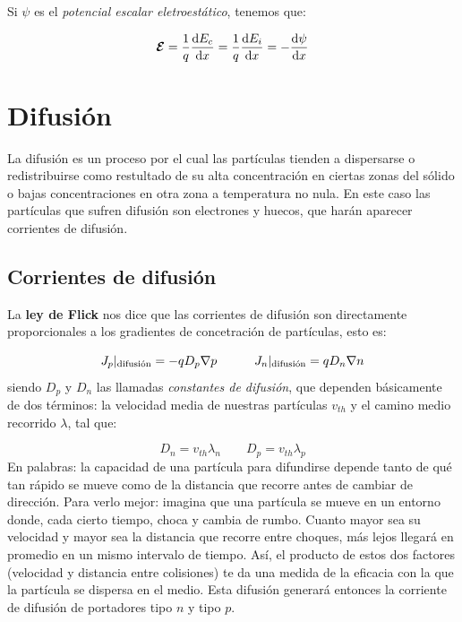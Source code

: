 Si $\psi$ es el \textit{potencial escalar eletroestático}, tenemos que:

\begin{equation}
	\boldsymbol{\mathcal{E}} = \frac{1}{q} \frac{\mathrm{d} E_c}{\mathrm{d} x}= \frac{1}{q} \frac{\mathrm{d} E_i}{\mathrm{d} x}=- \frac{\mathrm{d} \psi}{\mathrm{d} x}
\end{equation}


\section{Difusión}

La difusión es un proceso por el cual las partículas tienden a dispersarse o redistribuirse como restultado de su alta concentración en ciertas zonas del sólido o bajas concentraciones en otra zona a temperatura no nula. En este caso las partículas que sufren difusión son electrones y huecos, que harán aparecer corrientes de difusión.

\subsection{Corrientes de difusión}

La \textbf{ley de Flick} nos dice que las corrientes de difusión son directamente proporcionales a los gradientes de concetración de partículas, esto es:

\begin{equation}
	J_p|_{\text{difusión}} = -qD_p\nabla p \quad \quad \quad
	J_n|_{\text{difusión}} =  qD_n\nabla n
\end{equation}
siendo $D_p$ y $D_n$ las llamadas \textit{constantes de difusión}, que dependen básicamente de dos términos: la velocidad media de nuestras partículas $v_{th}$ y el camino medio recorrido $\lambda$, tal que:

\begin{equation}
	D_n = v_{th} \lambda_{n} \qquad D_p = v_{th} \lambda_{p}
\end{equation}
En palabras: la capacidad de una partícula para difundirse depende tanto de qué tan rápido se mueve como de la distancia que recorre antes de cambiar de dirección. Para verlo mejor: imagina que una partícula se mueve en un entorno donde, cada cierto tiempo, choca y cambia de rumbo. Cuanto mayor sea su velocidad y mayor sea la distancia que recorre entre choques, más lejos llegará en promedio en un mismo intervalo de tiempo. Así, el producto de estos dos factores (velocidad y distancia entre colisiones) te da una medida de la eficacia con la que la partícula se dispersa en el medio. Esta difusión generará entonces la corriente de difusión de portadores tipo $n$ y tipo $p$.

